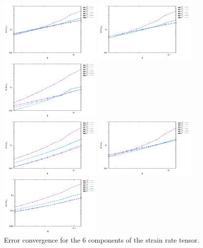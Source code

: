 \begin{center}
\includegraphics[width=5cm]{python_codes/fieldstone_75/results/burst/errors_exx}
\includegraphics[width=5cm]{python_codes/fieldstone_75/results/burst/errors_eyy}
\includegraphics[width=5cm]{python_codes/fieldstone_75/results/burst/errors_ezz}\\
\includegraphics[width=5cm]{python_codes/fieldstone_75/results/burst/errors_exy}
\includegraphics[width=5cm]{python_codes/fieldstone_75/results/burst/errors_exz}
\includegraphics[width=5cm]{python_codes/fieldstone_75/results/burst/errors_eyz}\\
{\captionfont Error convergence for the 6 components of the strain rate tensor.}
\end{center}


